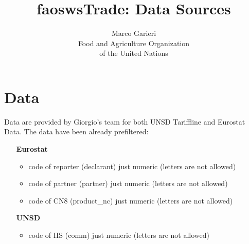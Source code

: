 \documentclass[nojss]{jss}\usepackage[]{graphicx}\usepackage[]{color}
\title{\bf faoswsTrade: Data Sources}
\author{Marco Garieri \\ Food and Agriculture Organization \\ of
  the United Nations}
\begin{document}
\newpage

%




\section{Data}
Data are provided by Giorgio's team for both UNSD Tariffline and Eurostat Data. The data have been already prefiltered:
\begin{itemize}
\item [\bf{Eurostat}]
\begin{itemize}
\item code of reporter (declarant) just numeric (letters are not allowed)
\item code of partner (partner) just numeric (letters are not allowed)
\item code of CN8 (product\_nc) just numeric (letters are not allowed)
\end{itemize}
\item [\bf{UNSD}]
\begin{itemize}
\item code of HS (comm) just numeric (letters are not allowed)
\end{itemize}
\end{itemize}
\end{document}
